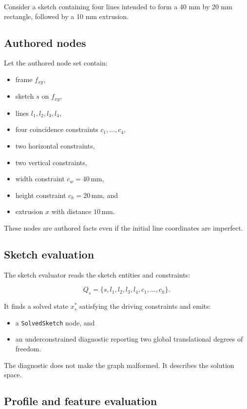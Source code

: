 \documentclass[11pt]{article}
\newcommand{\Type}[1]{\texttt{#1}}
\begin{document}
Consider a sketch containing four lines intended to form a 40 mm by 20 mm
rectangle, followed by a 10 mm extrusion.

\subsection{Authored nodes}

Let the authored node set contain:

\begin{itemize}
  \item frame $f_{xy}$,
  \item sketch $s$ on $f_{xy}$,
  \item lines $l_1,l_2,l_3,l_4$,
  \item four coincidence constraints $c_1,\ldots,c_4$,
  \item two horizontal constraints,
  \item two vertical constraints,
  \item width constraint $c_w=40\,\mathrm{mm}$,
  \item height constraint $c_h=20\,\mathrm{mm}$, and
  \item extrusion $x$ with distance $10\,\mathrm{mm}$.
\end{itemize}

These nodes are authored facts even if the initial line coordinates are
imperfect.

\subsection{Sketch evaluation}

The sketch evaluator reads the sketch entities and constraints:

\[
Q_s=\{s,l_1,l_2,l_3,l_4,c_1,\ldots,c_h\}.
\]

It finds a solved state $x_s^*$ satisfying the driving constraints and emits:

\begin{itemize}
  \item a \Type{SolvedSketch} node, and
  \item an underconstrained diagnostic reporting two global translational
    degrees of freedom.
\end{itemize}

The diagnostic does not make the graph malformed. It describes the solution
space.

\subsection{Profile and feature evaluation}
\end{document}
